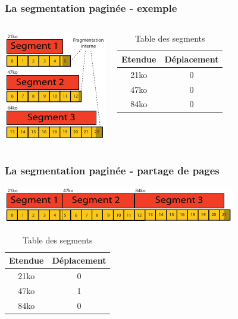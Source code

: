 \begin{frame}
\frametitle{La segmentation paginée - exemple}
\begin{columns}
\includegraphics[height=0.8\textheight]{../illustration/memoire_segment_paginee_exemple.pdf}
\begin{table}[htdp]
\caption{Table des segments}
\begin{center}
\begin{tabular}{c|c}
Etendue & Déplacement \\
\hline
21ko & 0 \\
47ko & 0 \\
84ko & 0 \\
\end{tabular}
\end{center}
\end{table}
\end{columns}
\end{frame}

\begin{frame}
\frametitle{La segmentation paginée - partage de pages}
\includegraphics[width=\textwidth]{../illustration/memoire_segment_paginee_exemple_partage.pdf}

\begin{table}[htdp]
\caption{Table des segments}
\begin{center}
\begin{tabular}{c|c}
Etendue & Déplacement \\
\hline
21ko & 0 \\
47ko & 1 \\
84ko & 0 \\
\end{tabular}
\end{center}
\end{table}
\end{frame}


